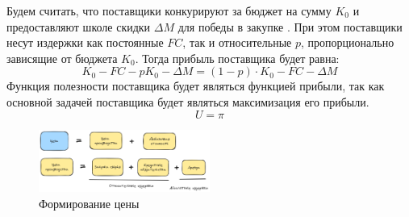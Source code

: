 Будем считать, что поставщики конкурируют за бюджет на сумму $K_0$ и 
предоставляют школе скидки $\Delta M$ для победы в закупке \cite{shubik1971game}.
 При этом поставщики несут издержки как постоянные $FC$, так и относительные $p$, пропорционально зависящие от бюджета $K_0$. Тогда прибыль поставщика будет равна:
\begin{equation}
    K_0- FC- pK_0- \Delta M = (1-p) \cdot K_0 -FC- \Delta M   
\end{equation}
Функция полезности поставщика будет являться функцией прибыли, так как основной задачей поставщика будет являться максимизация его прибыли.
\begin{equation}
    U = \pi
\end{equation}



\begin{figure}[h]
     \centering
     \includegraphics[width=0.5\textwidth]{assets/settings/price_form.excalidraw.png}
     \caption{Формирование цены}
 \end{figure}

